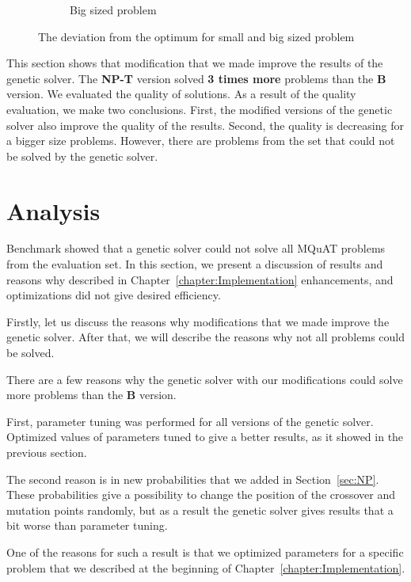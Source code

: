 \begin{figure}
\begin{subfigure}{0.45\textwidth}
		\caption{Big sized problem}
		\label{fig:MediumProblemEnergy}
	\end{subfigure}    
	\caption[The deviation from the optimum for small and big sized problem]{The deviation from the optimum for small and big sized problem}
	\label{fig:SmallMediumProblemEnergy}    
\end{figure}


This section shows that modification that we made improve the results of the genetic solver. The \textbf{NP-T} version solved \textbf{3 times more} problems than the \textbf{B} version. We evaluated the quality of solutions. As a result of the quality evaluation, we make two conclusions. First, the modified versions of the genetic solver also improve the quality of the results. Second, the quality is decreasing for a bigger size problems.
However, there are problems from the set that could not be solved by the genetic solver.


\section{Analysis}

Benchmark showed that a genetic solver could not solve all MQuAT problems from the evaluation set.
In this section, we present a discussion of results and reasons why described in Chapter~\ref{chapter:Implementation} enhancements, and optimizations did not give desired efficiency.

Firstly, let us discuss the reasons why modifications that we made improve the genetic solver. After that, we will describe the reasons why not all problems could be solved.

There are a few reasons why the genetic solver with our modifications could solve more problems than the \textbf{B} version. 

First, parameter tuning was performed for all versions of the genetic solver. Optimized values of parameters tuned to give a better results, as it showed in the previous section. 

The second reason is in new probabilities that we added in Section~\ref{sec:NP}. These probabilities give a possibility to change the position of the crossover and mutation points randomly, but as a result the genetic solver gives results that a bit worse than parameter tuning. 

One of the reasons for such a result is that we optimized parameters for a specific problem that we described at the beginning of Chapter~\ref{chapter:Implementation}.

